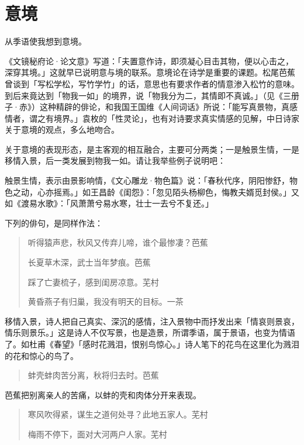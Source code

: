 {  \section*{\FS 意境}

  从季语使我想到意境。

  《文镜秘府论·论文意》写道：「夫置意作诗，即须凝心目击其物，便以心击之，深穿其境。」这就早已说明意与境的联系。意境论在诗学是重要的课题。松尾芭蕉曾谈到「写松学松，写竹学竹」的话，意思也有要求作者的情意渗入松竹的意味。到后来竟达到「物我一如」的境界，说「物我分为二，其情即不真诚。」（见《三册子·赤》）这种精辟的俳论，和我国王国维《人间词话》所说：「能写真景物，真感情者，谓之有境界。」袁枚的「性灵论」，也有对诗要求真实情感的见解，中日诗家关于意境的观点，多么地吻合。

  关于意境的表现形态，是主客观的相互融合，主要可分两类；一是触景生情，一是移情入景，后一类发展到物我一如。请让我举些例子说明吧：

  触景生情，表示由景影响情，《文心雕龙·物色篇》说：「春秋代序，阴阳惨舒，物色之动，心亦摇焉。」如王昌龄《闺怨》：「忽见陌头杨柳色，悔教夫婿觅封侯。」又如《渡易水歌》：「风萧萧兮易水寒，壮士一去兮不复还。」

  下列的俳句，是同样作法：

  \begin{quote}
      听得猿声悲，秋风又传弃儿啼，谁个最惨凄？\hfill 芭蕉

      长夏草木深，武士当年梦痕。\hfill 芭蕉

      踩了亡妻梳子，感到闺房凉意。\hfill 芜村

      黄昏燕子有归巢，我没有明天的目标。\hfill 一茶
  \end{quote}

  移情入景，诗人把自己真实、深沉的感情，注入景物中而抒发出来「情哀则景哀，情乐则景乐。」这是诗人不仅写景，也是造景，所谓季语，属于景语，也变为情语了。如杜甫《春望》「感时花溅泪，恨别鸟惊心。」诗人笔下的花鸟在这里化为溅泪的花和惊心的鸟了。

  \begin{quote}
      蚌壳蚌肉苦分离，秋将归去时。\hfill 芭蕉
  \end{quote}

  芭蕉把别离亲人的苦痛，以蚌的壳和肉体分开来表现。

  \begin{quote}
      寒风吹得紧，谋生之道何处寻？此地五家人。\hfill 芜村

      梅雨不停下，面对大河两户人家。\hfill 芜村
  \end{quote}

}
